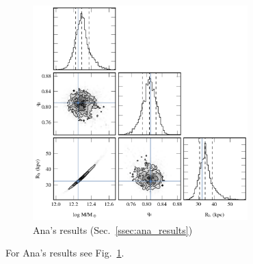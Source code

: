 \begin{figure}
\includegraphics[width=83mm]{./figures/ana_results.png}
  \caption{Ana's results (Sec.~\ref{ssec:ana_results})}
  \label{plot_ana_results}
\end{figure}

For Ana's results see Fig.~\ref{plot_ana_results}.
